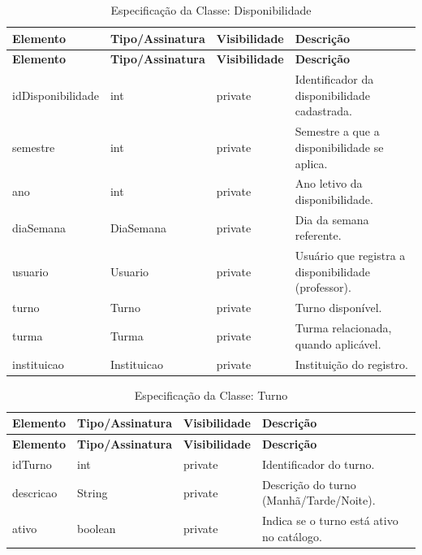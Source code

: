 \fonteautores

\vspace{\baselineskip}

\Needspace{0.32\textheight}
\begin{longtable}{|L{3.5cm}|L{3.5cm}|L{3.5cm}|L{3.5cm}|}
\caption{Especificação da Classe: Disponibilidade} \\
\hline
\textbf{Elemento} & \textbf{Tipo/Assinatura} & \textbf{Visibilidade} & \textbf{Descrição} \\
\hline
\endfirsthead
\hline
\textbf{Elemento} & \textbf{Tipo/Assinatura} & \textbf{Visibilidade} & \textbf{Descrição} \\
\hline
\endhead
idDisponibilidade & int & private & Identificador da disponibilidade cadastrada. \\
\hline
semestre & int & private & Semestre a que a disponibilidade se aplica. \\
\hline
ano & int & private & Ano letivo da disponibilidade. \\
\hline
diaSemana & DiaSemana & private & Dia da semana referente. \\
\hline
usuario & Usuario & private & Usuário que registra a disponibilidade (professor). \\
\hline
turno & Turno & private & Turno disponível. \\
\hline
turma & Turma & private & Turma relacionada, quando aplicável. \\
\hline
instituicao & Instituicao & private & Instituição do registro. \\
\hline
\end{longtable}

\fonteautores

\vspace{\baselineskip}

\Needspace{0.32\textheight}
\begin{longtable}{|L{3.5cm}|L{3.5cm}|L{3.5cm}|L{3.5cm}|}
\caption{Especificação da Classe: Turno} \\
\hline
\textbf{Elemento} & \textbf{Tipo/Assinatura} & \textbf{Visibilidade} & \textbf{Descrição} \\
\hline
\endfirsthead
\hline
\textbf{Elemento} & \textbf{Tipo/Assinatura} & \textbf{Visibilidade} & \textbf{Descrição} \\
\hline
\endhead
idTurno & int & private & Identificador do turno. \\
\hline
descricao & String & private & Descrição do turno (Manhã/Tarde/Noite). \\
\hline
ativo & boolean & private & Indica se o turno está ativo no catálogo. \\
\hline
\end{longtable}

